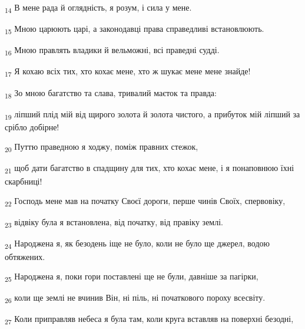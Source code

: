 \begin{tcolorbox}
\textsubscript{14} В мене рада й оглядність, я розум, і сила у мене.
\end{tcolorbox}
\begin{tcolorbox}
\textsubscript{15} Мною царюють царі, а законодавці права справедливі встановлюють.
\end{tcolorbox}
\begin{tcolorbox}
\textsubscript{16} Мною правлять владики й вельможні, всі праведні судді.
\end{tcolorbox}
\begin{tcolorbox}
\textsubscript{17} Я кохаю всіх тих, хто кохає мене, хто ж шукає мене мене знайде!
\end{tcolorbox}
\begin{tcolorbox}
\textsubscript{18} Зо мною багатство та слава, тривалий маєток та правда:
\end{tcolorbox}
\begin{tcolorbox}
\textsubscript{19} ліпший плід мій від щирого золота й золота чистого, а прибуток мій ліпший за срібло добірне!
\end{tcolorbox}
\begin{tcolorbox}
\textsubscript{20} Путтю праведною я ходжу, поміж правних стежок,
\end{tcolorbox}
\begin{tcolorbox}
\textsubscript{21} щоб дати багатство в спадщину для тих, хто кохає мене, і я понаповнюю їхні скарбниці!
\end{tcolorbox}
\begin{tcolorbox}
\textsubscript{22} Господь мене мав на початку Своєї дороги, перше чинів Своїх, спервовіку,
\end{tcolorbox}
\begin{tcolorbox}
\textsubscript{23} відвіку була я встановлена, від початку, від правіку землі.
\end{tcolorbox}
\begin{tcolorbox}
\textsubscript{24} Народжена я, як безодень іще не було, коли не було ще джерел, водою обтяжених.
\end{tcolorbox}
\begin{tcolorbox}
\textsubscript{25} Народжена я, поки гори поставлені ще не були, давніше за пагірки,
\end{tcolorbox}
\begin{tcolorbox}
\textsubscript{26} коли ще землі не вчинив Він, ні піль, ні початкового пороху всесвіту.
\end{tcolorbox}
\begin{tcolorbox}
\textsubscript{27} Коли приправляв небеса я була там, коли круга вставляв на поверхні безодні,
\end{tcolorbox}
